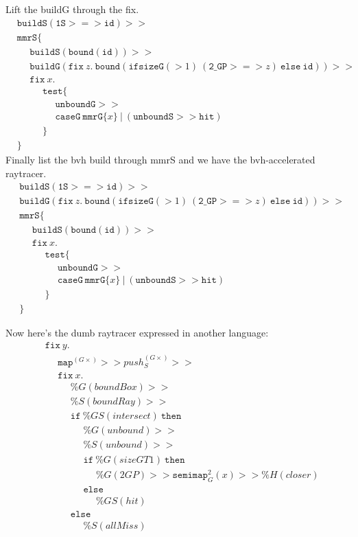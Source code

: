 \documentclass{article}
\newcommand {\fix}{\mathtt{fix}}
\newcommand {\test}{\mathtt{test}}
\newcommand {\isect}{\mathtt{hit}}
\newcommand {\buildG}{\mathtt{buildG}}
\newcommand {\buildS}{\mathtt{buildS}}
\newcommand {\id}{\mathtt{id}}
\newcommand {\unboundG}{\mathtt{unboundG}}
\newcommand {\unboundS}{\mathtt{unboundS}}
\newcommand {\mmrG}{\mathtt{mmrG}}
\newcommand {\mmrS}{\mathtt{mmrS}}
\newcommand {\oneS}{\mathtt{1S}}
\newcommand {\twoGP}{\mathtt{2\_GP}}
\newcommand {\semimap}{\mathtt{semimap}}
\newcommand {\map}{\mathtt{map}}
\newcommand {\bound}{\mathtt{bound}}
\newcommand {\tab}{~~~~~~}
\begin{document}
Lift the buildG through the fix.
\begin{align*}
&\buildS (\oneS >=> \id) >> \\
&\mmrS \{ \\
&\tab \buildS(\bound (\mathtt{id})) >> \\
&\tab \buildG (\fix~z.~\bound(\mathtt{ifsizeG}(>1)~(\twoGP >=> z)~\mathtt{else}~\id)) >> \\
&\tab\fix~x. \\
&\tab\tab\test \{ \\
&\tab\tab\tab \unboundG >> \\
&\tab\tab\tab \mathtt{caseG}~\mmrG \{x\}~|~(\unboundS >> \isect)\\
&\tab \tab \} \\
&\}
\end{align*}
Finally list the bvh build through mmrS and we have the bvh-accelerated raytracer.
\begin{align*}
&\buildS (\oneS >=> \id) >> \\
&\buildG (\fix~z.~\bound(\mathtt{ifsizeG}(>1)~(\twoGP >=> z)~\mathtt{else}~\id)) >> \\
&\mmrS \{ \\
&\tab \buildS(\bound (\mathtt{id})) >> \\
&\tab\fix~x. \\
&\tab\tab\test \{ \\
&\tab\tab\tab \unboundG >> \\
&\tab\tab\tab \mathtt {caseG}~\mmrG\{x\}~|~(\unboundS>>\isect) \\
&\tab \tab \} \\
&\}
\end{align*}

Now here's the dumb raytracer expressed in another language:
\begin{align*}
&\fix~y. \\
&\tab \map^{(G\times)} >> push^{(G\times)}_{S} >> \\
&\tab \fix~x. \\
&\tab\tab \%G(boundBox) >> \\
&\tab\tab \%S(boundRay) >> \\
&\tab\tab \mathtt{if}~\%GS(intersect)~\mathtt{then} \\
&\tab\tab\tab \%G(unbound) >> \\
&\tab\tab\tab \%S(unbound) >> \\
&\tab\tab\tab \mathtt{if}~\%G(sizeGT1)~\mathtt{then}\\
&\tab\tab\tab\tab \%G(2GP) >> \semimap_G^{2}(x) >> \%H(closer) \\
&\tab\tab\tab \mathtt{else}\\
&\tab\tab\tab\tab \%GS(hit)  \\
&\tab\tab \mathtt{else} \\
&\tab\tab\tab \%S(allMiss)
\end{align*}
\end{document}
